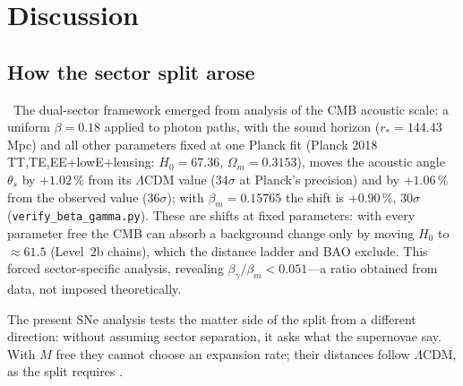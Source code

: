 \section{Discussion}\label{sec:dsv_discussion}
\subsection{How the sector split arose}
\calc\ The dual-sector framework emerged from analysis of the CMB acoustic scale: a uniform $\beta=0.18$ applied to photon paths, with the sound horizon
($r_*=144.43$ Mpc) and all other parameters fixed at one Planck fit (Planck 2018 TT,TE,EE+lowE+lensing: $H_0=67.36$, $\Omega_m=0.3153$), moves the acoustic angle $\theta_s$ by $+1.02\,\%$ from its $\Lambda$CDM value ($34\sigma$ at Planck's
precision) and by $+1.06\,\%$ from the observed value ($36\sigma$); with $\beta_m=0.15765$ the shift is $+0.90\,\%$, $30\sigma$ (\texttt{verify\_beta\_gamma.py}).
These are shifts at fixed parameters: with every parameter free the CMB can absorb a background change only by moving $H_0$ to $\approx61.5$ (Level~2b
chains), which the distance ladder and BAO exclude. This forced sector-specific analysis, revealing $\beta_\gamma/\beta_m<0.051$---a ratio obtained from
data, not imposed theoretically.

The present SNe analysis tests the matter side of the split from a different direction: without assuming sector separation, it asks what the supernovae
say. With $M$ free they cannot choose an expansion rate; their distances follow $\Lambda$CDM, as the split requires \derived.

